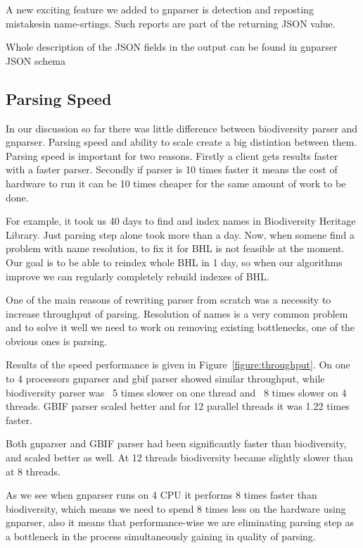 \documentclass{bmcart}
\begin{document}
A new exciting feature we added to gnparser is detection and reposting
mistakesin name-srtings. Such reports are part of the returning JSON value.

Whole description of the JSON fields in the output can be found in gnparser
JSON schema

\subsection*{Parsing Speed}

In our discussion so far there was little difference between biodiversity
parser and gnparser. Parsing speed and ability to scale create a big
distintion between them. Parsing speed is important for two reasons. Firstly a
client gets results faster with a faster parser. Secondly if parser is 10
times faster it means the cost of hardware to run it can be 10 times cheaper
for the same amount of work to be done.

For example, it took us 40 days to find and index names in Biodiversity
Heritage Library. Just parsing step alone took more than a day. Now, when
somene find a problem with name resolution, to fix it for BHL is not feasible
at the moment. Our goal is to be able to reindex whole BHL in 1 day, so when
our algorithms improve we can regularly completely rebuild indexes of BHL.

One of the main reasons of rewriting parser from scratch was a necessity to
increase throughput of parsing. Resolution of names is a very common problem
and to solve it well we need to work on removing existing bottlenecks, one of
the obvious ones is parsing.

Results of the speed performance is given in Figure~\ref{figure:throughput}.
On one to 4 processors gnparser and gbif parser showed similar throughput,
while biodiversity parser was ~5 times slower on one thread and ~8 times
slower on 4 threads. GBIF parser scaled better and for 12 parallel threads it
was 1.22 times faster.

Both gnparser and GBIF parser had been significantly faster than biodiversity,
and scaled better as well. At 12 threads biodiversity became slightly slower
than at 8 threads.

As we see when gnparser runs on 4 CPU it performs 8 times faster than
biodiversity, which means we need to spend 8 times less on the hardware using
gnparser, also it means that performance-wise we are eliminating parsing step
as a bottleneck in the process simultaneously gaining in quality of parsing.
\end{document}
